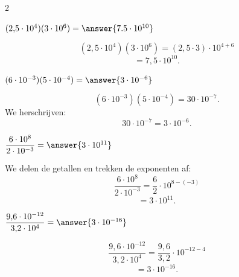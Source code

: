 \documentclass{ximera}
\begin{document}
\begin{oefening}{\oefB\ESS}
\begin{multicols}{2}
            
            \begin{question}
            $(2{,}5\cdot10^4)(3\cdot10^6)
            =\answer{7.5\cdot10^{10}}$
            
            \begin{oplossing}
            \[
            (2{,}5\cdot10^4)(3\cdot10^6)
            =(2{,}5\cdot3)\cdot10^{4+6}
            \]
            \[
            =7{,}5\cdot10^{10}.
            \]
            \end{oplossing}
            \end{question}
            
            
            \begin{question}
            $(6\cdot10^{-3})(5\cdot10^{-4})
            =\answer{3\cdot10^{-6}}$
            
            \begin{oplossing}
            \[
            (6\cdot10^{-3})(5\cdot10^{-4})
            =30\cdot10^{-7}.
            \]
            We herschrijven:
            \[
            30\cdot10^{-7}
            =3\cdot10^{-6}.
            \]
            \end{oplossing}
            \end{question}
            
            
            \begin{question}
            $\dfrac{6\cdot10^8}{2\cdot10^{-3}}
            =\answer{3\cdot10^{11}}$
            
            \begin{oplossing}
            We delen de getallen en trekken de exponenten af:
            \[
            \dfrac{6\cdot10^8}{2\cdot10^{-3}}
            =\dfrac62\cdot10^{8-(-3)}
            \]
            \[
            =3\cdot10^{11}.
            \]
            \end{oplossing}
            \end{question}
            
            
            \begin{question}
            $\dfrac{9{,}6\cdot10^{-12}}
            {3{,}2\cdot10^4}
            =\answer{3\cdot10^{-16}}$
            
            \begin{oplossing}
            \[
            \dfrac{9{,}6\cdot10^{-12}}
            {3{,}2\cdot10^4}
            =\dfrac{9{,}6}{3{,}2}\cdot10^{-12-4}
            \]
            \[
            =3\cdot10^{-16}.
            \]
            \end{oplossing}
            \end{question}
            

\end{multicols}
\end{oefening}
\end{document}
